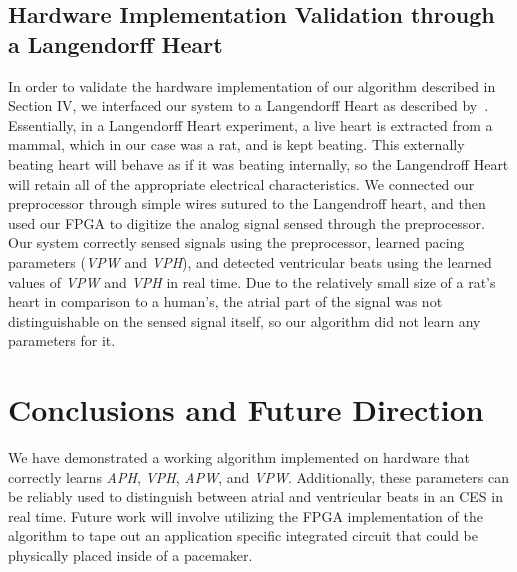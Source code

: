 \documentclass[conference]{IEEEtran}
\newcommand{\APW}{\textit{APW}}
\newcommand{\VPW}{\textit{VPW}}
\newcommand{\APH}{\textit{APH}}
\newcommand{\VPH}{\textit{VPH}}
\begin{document}
\subsection{Hardware Implementation Validation through a Langendorff Heart}
In order to validate the hardware implementation of
our algorithm described in Section IV, we interfaced our
system to a Langendorff Heart as described by~\cite{langendorff}.
Essentially, in a Langendorff Heart experiment, a live
heart is extracted from a mammal, which in our case was
a rat, and is kept beating. This externally beating heart
will behave as if it was beating internally, so the
Langendroff Heart will retain all of the appropriate
electrical characteristics.
We connected our preprocessor through simple wires
sutured to the Langendroff heart, and then used our
FPGA to digitize the analog signal sensed through the
preprocessor. Our system correctly sensed signals using
the preprocessor, learned pacing parameters (\VPW{} and
\VPH{}), and detected ventricular beats using the learned
values of \VPW{} and \VPH{} in real time. Due to the
relatively small size of a rat's heart in comparison to a
human's, the atrial part of the signal was not
distinguishable on the sensed signal itself, so our
algorithm did not learn any parameters for it.

\section{Conclusions and Future Direction}
We have demonstrated a working algorithm
implemented on hardware that correctly learns \APH{},
\VPH{}, \APW{}, and \VPW{}. Additionally, these parameters
can be reliably used to distinguish between atrial and
ventricular beats in an CES in real time. Future
work will involve utilizing the FPGA implementation of
the algorithm to tape out an application specific
integrated circuit that could be physically placed inside
of a pacemaker.

%
%
\end{document}

